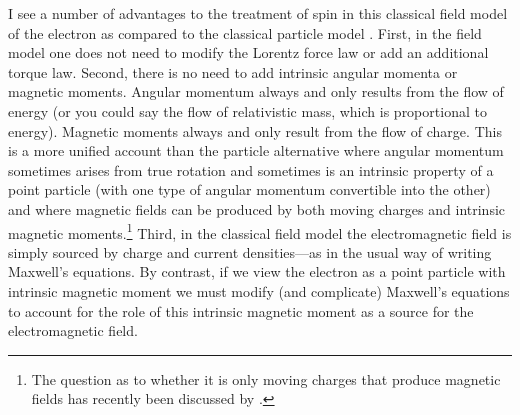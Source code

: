 \documentclass[onecolumn,secnumarabic,amsmath,amssymb,balancelastpage,nofootinbib,12pt]{article}
\begin{document}
I see a number of advantages to the treatment of spin in this classical field model of the electron as compared to the classical particle model \citep[sec.\ 6]{spinmeasurement}.  First, in the field model one does not need to modify the Lorentz force law or add an additional torque law.  Second, there is no need to add intrinsic angular momenta or magnetic moments.  Angular momentum always and only results from the flow of energy (or you could say the flow of relativistic mass, which is proportional to energy).  Magnetic moments always and only result from the flow of charge.  This is a more unified account than the particle alternative where angular momentum sometimes arises from true rotation and sometimes is an intrinsic property of a point particle (with one type of angular momentum convertible into the other) and where magnetic fields can be produced by both moving charges and intrinsic magnetic moments.\footnote{The question as to whether it is only moving charges that produce magnetic fields has recently been discussed by \citet{fahy2022, griffiths2022}.}  Third, in the classical field model the electromagnetic field is simply sourced by charge and current densities---as in the usual way of writing Maxwell's equations.  By contrast, if we view the electron as a point particle with intrinsic magnetic moment we must modify (and complicate) Maxwell's equations to account for the role of this intrinsic magnetic moment as a source for the electromagnetic field.
\end{document}
